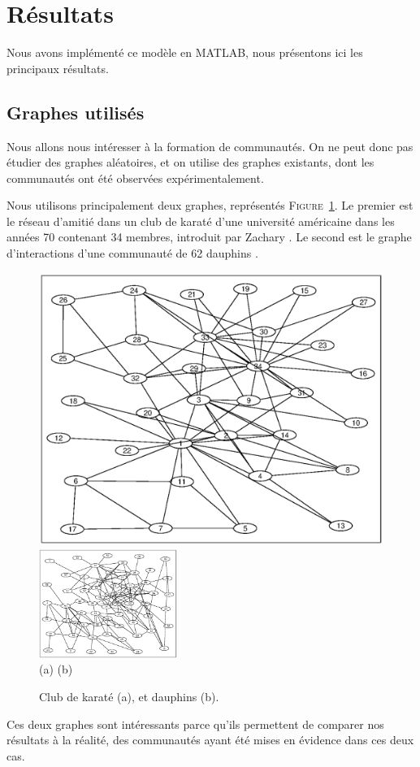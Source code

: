 \documentclass[12pt]{article}
\newcommand{\fig}[1]{\textsc{Figure}~\ref{#1}}
\begin{document}
\section{Résultats}
Nous avons implémenté ce modèle en \textsc{MATLAB}, nous présentons ici
les principaux résultats.


\subsection{Graphes utilisés}
Nous allons nous intéresser à la formation de communautés. On ne peut
donc pas étudier des graphes aléatoires, et on utilise des graphes
existants, dont les communautés ont été observées expérimentalement.

Nous utilisons principalement deux graphes, représentés
\fig{exemples_graphes}. Le premier est le réseau d'amitié dans un club
de karaté d'une université américaine dans les années 70 contenant 34
membres, introduit par Zachary \cite{zachary}. Le second est le graphe
d'interactions d'une communauté de 62 dauphins \cite{dolphins}.

\begin{figure}[htb]
	\begin{center}
		\includegraphics[width=.4 \textwidth]{zachary}
		\includegraphics[width=0.4\textwidth]{dolphins}\\
		\hfill (a) \hfill (b) \hfill~\\
	\end{center}
	\caption{Club de karaté (a), et dauphins (b).}
	\label{exemples_graphes}
\end{figure}

Ces deux graphes sont intéressants parce qu'ils permettent de comparer
nos résultats à la réalité, des communautés ayant été mises en
évidence dans ces deux cas.
\end{document}

